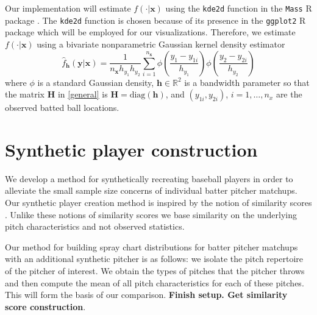\documentclass[11pt]{article}
\newcommand{\R}{\mathbb{R}}
\newcommand{\Hbf}{\textbf{H}}
\newcommand{\y}{\textbf{y}}
\newcommand{\x}{\textbf{x}}
\newcommand{\h}{\textbf{h}}
\begin{document}
Our implementation will estimate $f(\cdot|\x)$ using the \texttt{kde2d} function in the \texttt{Mass} R package \citep{MASS}. 
The \texttt{kde2d} function is chosen because of its presence 
in the \texttt{ggplot2} R package \citep{ggplot2} which will be employed for our visualizations. Therefore, we estimate $f(\cdot|\x)$ using a bivariate nonparametric Gaussian kernel density estimator
\begin{equation} \label{spraydens}
  \hat f_\h(\y|\x) = 
    \frac{1}{n_\x h_{y_1}h_{y_2}}\sum_{i=1}^{n_\x} \phi\left(\frac{y_1 - y_{1i}}{h_{y_1}}\right)
      \phi\left(\frac{y_2 - y_{2i}}{h_{y_2}}\right)
\end{equation}
where $\phi$ is a standard Gaussian density, $\h \in \R^2$ is a bandwidth parameter so that the matrix $\Hbf$ in \eqref{general} is $\Hbf = \text{diag}(\h)$, and $(y_{1i},y_{2i})$, $i = 1,\ldots,n_x$ are the observed batted ball locations. 






\section{Synthetic player construction}

We develop a method for synthetically recreating baseball players in order to alleviate the small sample size concerns of individual batter pitcher matchups. Our synthetic player creation method is %
inspired by the notion of similarity scores \citep{james1994politics, PECOTA}. Unlike these notions of similarity scores we base similarity on the underlying pitch characteristics and not observed statistics.

Our method for building spray chart distributions for batter pitcher matchups with an additional  synthetic pitcher is as follows: we isolate the pitch repertoire of the pitcher of interest. We obtain the types of pitches that the pitcher throws and then compute the mean of all pitch characteristics for each of these pitches. This will form the basis of our comparison. \textbf{Finish setup. Get similarity score construction}.
\end{document}
